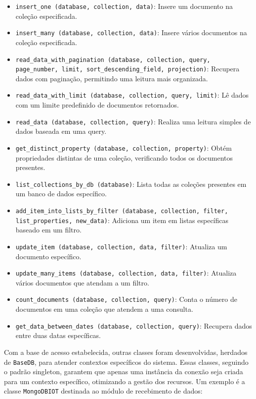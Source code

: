 \begin{itemize}
    \item \texttt{insert\_one (database, collection, data)}: Insere um documento na coleção especificada.
    \item \texttt{insert\_many (database, collection, data)}: Insere vários documentos na coleção especificada.
    \item \texttt{read\_data\_with\_pagination (database, collection, query, page\_number, limit, sort\_descending\_field, projection)}: Recupera dados com paginação, permitindo uma leitura mais organizada.
    \item \texttt{read\_data\_with\_limit (database, collection, query, limit)}: Lê dados com um limite predefinido de documentos retornados.
    \item \texttt{read\_data (database, collection, query)}: Realiza uma leitura simples de dados baseada em uma query.
    \item \texttt{get\_distinct\_property (database, collection, property)}: Obtém propriedades distintas de uma coleção, verificando todos os documentos presentes.
    \item \texttt{list\_collections\_by\_db (database)}: Lista todas as coleções presentes em um banco de dados específico.
    \item \texttt{add\_item\_into\_lists\_by\_filter (database, collection, filter, list\_properties, new\_data)}: Adiciona um item em listas específicas baseado em um filtro.
    \item \texttt{update\_item (database, collection, data, filter)}: Atualiza um documento específico.
    \item \texttt{update\_many\_items (database, collection, data, filter)}: Atualiza vários documentos que atendam a um filtro.
    \item \texttt{count\_documents (database, collection, query)}: Conta o número de documentos em uma coleção que atendem a uma consulta.
    \item \texttt{get\_data\_between\_dates (database, collection, query)}: Recupera dados entre duas datas específicas.
\end{itemize}

Com a base de acesso estabelecida, outras classes foram desenvolvidas, herdados de \texttt{BaseDB}, para atender contextos específicos do sistema. Essas classes, seguindo o padrão singleton, garantem que apenas uma instância da conexão seja criada para um contexto específico, otimizando a gestão dos recursos. Um exemplo é a classe \texttt{MongoDBIOT} destinada ao módulo de recebimento de dados:


